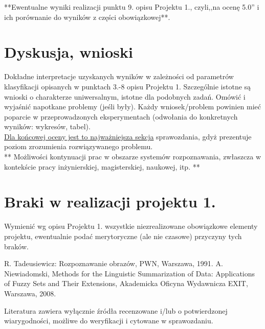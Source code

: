 \documentclass{classrep}
\begin{document}
{**Ewentualne wyniki realizacji punktu 9. opisu Projektu 1., czyli,,na ocenę 5.0'' i ich porównanie do wyników z
części obowiązkowej**.}\\



\section{Dyskusja, wnioski}

Dokładne interpretacje uzyskanych wyników w zależności od parametrów klasyfikacji
opisanych w punktach 3.-8 opisu Projektu 1. 
Szczególnie istotne są wnioski o charakterze uniwersalnym, istotne dla podobnych zadań. 
Omówić i wyjaśnić napotkane problemy (jeśli były). Każdy wniosek/problem powinien mieć poparcie
w przeprowadzonych eksperymentach (odwołania do konkretnych wyników: wykresów,
tabel). \\
\underline{Dla końcowej oceny jest to najważniejsza sekcja} sprawozdania, gdyż prezentuje poziom
zrozumienia rozwiązywanego problemu.\\

** Możliwości kontynuacji prac w obszarze systemów rozpoznawania, zwłaszcza w kontekście pracy inżynierskiej,
magisterskiej, naukowej, itp. **\\



\section{Braki w realizacji projektu 1.}
Wymienić wg opisu Projektu 1. wszystkie niezrealizowane obowiązkowe elementy projektu, ewentualnie
podać merytoryczne (ale nie czasowe) przyczyny tych braków. 


\begin{thebibliography}{0}
 R. Tadeusiewicz: Rozpoznawanie obrazów, PWN, Warszawa, 1991.  
 A. Niewiadomski, Methods for the Linguistic Summarization of Data: Applications of Fuzzy Sets and Their Extensions, Akademicka Oficyna Wydawnicza EXIT, Warszawa, 2008.
\end{thebibliography}

Literatura zawiera wyłącznie źródła recenzowane i/lub o potwierdzonej wiarygodności,
możliwe do weryfikacji i cytowane w sprawozdaniu. 
\end{document}
